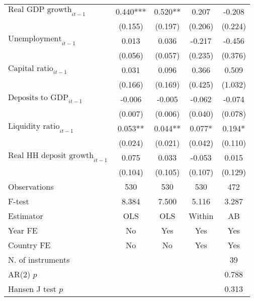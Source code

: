 \begin{longtable}{m{8cm}*{4}{c}}
$\text{Real GDP growth}_{it-1}$&       0.440***&       0.520** &       0.207   &      -0.208   \\
                    &     (0.155)   &     (0.197)   &     (0.206)   &     (0.224)   \\
$\text{Unemployment}_{it-1}$&       0.013   &       0.036   &      -0.217   &      -0.456   \\
                    &     (0.056)   &     (0.057)   &     (0.235)   &     (0.376)   \\
$\text{Capital ratio}_{it-1}$&       0.031   &       0.096   &       0.366   &       0.509   \\
                    &     (0.166)   &     (0.169)   &     (0.425)   &     (1.032)   \\
$\text{Deposits to GDP}_{it-1}$&      -0.006   &      -0.005   &      -0.062   &      -0.074   \\
                    &     (0.007)   &     (0.006)   &     (0.040)   &     (0.078)   \\
$\text{Liquidity ratio}_{it-1}$&       0.053** &       0.044** &       0.077*  &       0.194*  \\
                    &     (0.024)   &     (0.021)   &     (0.042)   &     (0.110)   \\
$\text{Real HH deposit growth}_{it-1}$&       0.075   &       0.033   &      -0.053   &       0.015   \\
                    &     (0.104)   &     (0.105)   &     (0.107)   &     (0.129)   \\
\midrule
Observations        &         530   &         530   &         530   &         472   \\
F-test              &       8.384   &       7.500   &       5.116   &       3.287   \\
Estimator           &         OLS   &         OLS   &      Within   &          AB   \\
Year FE             &          No   &         Yes   &         Yes   &         Yes   \\
Country FE          &          No   &          No   &         Yes   &         Yes   \\
N. of instruments   &               &               &               &          39   \\
AR(2) \(p\)         &               &               &               &       0.788   \\
Hansen J test \(p\) &               &               &               &       0.313   \\

\end{longtable}
